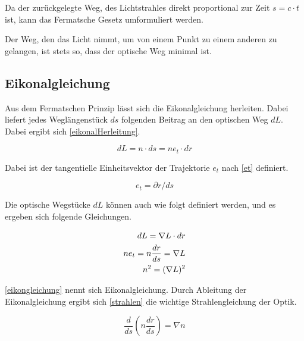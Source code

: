 Da der zurückgelegte Weg, des Lichtstrahles direkt proportional zur Zeit $s = c \cdot t$ ist,
kann das Fermatsche Gesetz umformuliert werden.


Der Weg, den das Licht nimmt, 
um von einem Punkt zu einem anderen zu gelangen, 
ist stets so, dass der optische Weg minimal ist.


\subsection{Eikonalgleichung}

Aus dem Fermatschen Prinzip lässt sich die Eikonalgleichung herleiten.
Dabei liefert jedes Weglängenstück $ds$ folgenden Beitrag an den optischen Weg $dL$. 
Dabei ergibt sich \eqref{eikonalHerleitung}.

\begin{equation}
	dL = n \cdot ds = n e_t \cdot dr
	\label{eikonalHerleitung}
\end{equation}

Dabei ist der tangentielle Einheitsvektor der Trajektorie $e_t$ nach  \eqref{et} definiert.

\begin{equation}
	e_t = \partial r / ds
	\label{et}
\end{equation}

Die optische Wegstücke $dL$ können auch wie folgt  definiert werden, 
und es ergeben sich folgende Gleichungen.

\begin{align}
	dL = \nabla L \cdot dr \notag \\
	n e_t = n \frac{dr}{ds} = \nabla L \notag \\
	n^2 = (\nabla L)^2 \label{eikongleichung}
\end{align}

\eqref{eikongleichung} nennt sich Eikonalgleichung.
Durch Ableitung der Eikonalgleichung ergibt sich \eqref{strahlen} die wichtige Strahlengleichung der Optik.

\begin{equation}
	\frac{d}{ds} \left ( n \frac{dr}{ds} \right ) = \nabla n
	\label{strahlen}
\end{equation}

